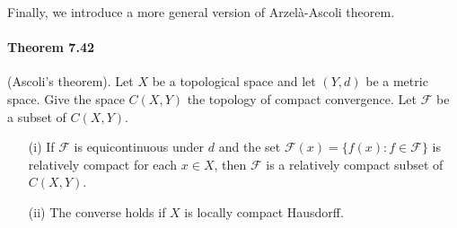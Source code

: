 \documentclass{article}
\numberwithin{equation}{section}
\theoremstyle{plain}
\theoremstyle{definition}
\begin{document}
Finally, we introduce a more general version of Arzelà-Ascoli theorem.
\paragraph{Theorem 7.42\label{thm:7.42}} (Ascoli's theorem). Let $X$ be a topological space and let $(Y,d)$ be a metric space. Give the space $C(X,Y)$ the topology of compact convergence. Let $\mathcal{F}$ be a subset of $C(X,Y)$.
\begin{itemize}
	\item[(i)] If $\mathcal{F}$ is equicontinuous under $d$ and the set $\mathcal{F}(x)=\{f(x):f\in\mathcal{F}\}$ is relatively compact for each $x\in X$, then $\mathcal{F}$ is a relatively compact subset of $C(X,Y)$.
	\item[(ii)] The converse holds if $X$ is locally compact Hausdorff.
\end{itemize}
\end{document}
